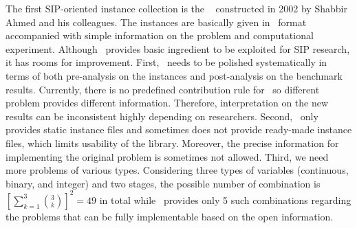 The first SIP-oriented instance collection is the \siplib\ \cite{web:SIPLIB1} constructed in 2002 by Shabbir Ahmed and his colleagues. The instances are basically given in \smps\ format accompanied with simple information on the problem and computational experiment. Although \siplib\ provides basic ingredient to be exploited for SIP research, it has rooms for improvement. First, \siplib\ needs to be polished systematically in terms of both pre-analysis on the instances and post-analysis on the benchmark results. Currently, there is no predefined contribution rule for \siplib\ so different problem provides different information. Therefore, interpretation on the new results can be inconsistent highly depending on researchers. Second, \siplib\ only provides static instance files and sometimes does not provide ready-made instance files, which limits usability of the library. Moreover, the precise information for implementing the original problem is sometimes not allowed. Third, we need more problems of various types. Considering three types of variables (continuous, binary, and integer) and two stages, the possible number of combination is $\left[\sum_{k=1}^3\binom{3}{k}\right]^2=49$ in total while \siplib\ provides only 5 such combinations regarding the problems that can be fully implementable based on the open information.








